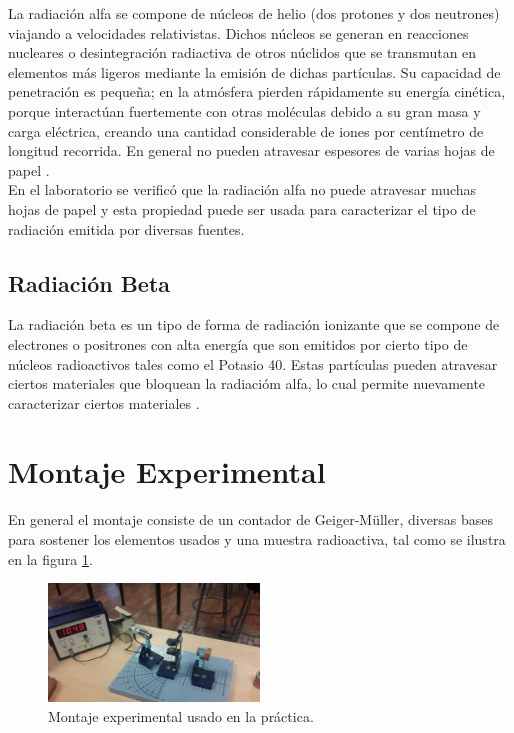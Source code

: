 \documentclass[prb,aps,twocolumn,preprintnumbers,amsmath,amssymb]{revtex4}
\begin{document}
La radiación alfa se compone de núcleos de helio (dos protones y dos neutrones) viajando a velocidades relativistas. Dichos núcleos se generan en reacciones nucleares o desintegración radiactiva de otros núclidos que se transmutan en elementos más ligeros mediante la emisión de dichas partículas. Su capacidad de penetración es pequeña; en la atmósfera pierden rápidamente su energía cinética, porque interactúan fuertemente con otras moléculas debido a su gran masa y carga eléctrica, creando una cantidad considerable de iones por centímetro de longitud recorrida. En general no pueden atravesar espesores de varias hojas de papel \cite{hyperphyisics}.\\

En el laboratorio se verificó que la radiación alfa no puede atravesar muchas hojas de papel y esta propiedad puede ser usada para caracterizar el tipo de radiación emitida por diversas fuentes. 


\subsection{Radiación Beta}

La radiación beta es  un tipo de forma de radiación ionizante que se compone de electrones o positrones con alta energía que son emitidos por cierto tipo de núcleos radioactivos tales como el Potasio 40. Estas partículas pueden atravesar ciertos materiales que bloquean la radiacióm alfa, lo cual permite nuevamente caracterizar ciertos materiales \cite{hyperphyisics}.

\section{Montaje Experimental}

En general el montaje consiste de un contador de Geiger-Müller, diversas bases para sostener los elementos usados y una muestra radioactiva, tal como se ilustra en la figura \ref{fig: montaje}.

\begin{figure}[h!]
	\centering
	\includegraphics[width=0.5\textwidth]{montaje}
	\caption{ Montaje experimental usado en la práctica. }
	\label{fig: montaje}
\end{figure}
\end{document}
